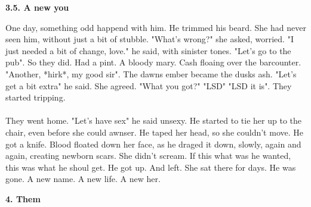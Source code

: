 \documentclass[]{article}
\begin{document}
\begin{center}
	\textbf{3.5. A new you}
\end{center}

One day, something odd happend with him. He trimmed his beard. She had never seen him, without just a bit of stubble. "What's wrong?" she asked, worried. "I just needed a bit of change, love." he said, with sinister tones. "Let's go to the pub". So they did. Had a pint. A bloody mary. Cash floaing over the barcounter. "Another, *hirk*, my good sir". The dawns ember became the dusks ash. "Let's get a bit extra" he said. She agreed. "What you got?" "LSD" "LSD it is". They started tripping. 
\\ \\
They went home. "Let's have sex" he said unsexy. He started to tie her up to the chair, even before she could awnser. He taped her head, so she couldn't move. He got a knife. Blood floated down her face, as he draged it down, slowly, again and again, creating newborn scars. She didn't scream. If this what was he wanted, this was what he shoul get. He got up. And left. She sat there for days. He was gone. A new name. A new life. A new her.

\newpage

\begin{center}
	\large\textbf{4. Them}
\end{center}
\end{document}
